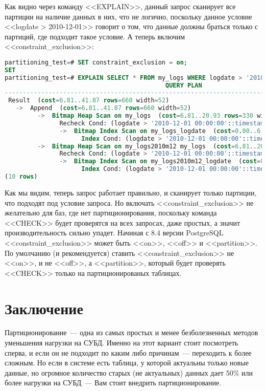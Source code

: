 Как видно через команду <<EXPLAIN>>, данный запрос сканирует все партиции на наличие данных в них, что не логично, 
поскольку данное условие <<logdate > 2010-12-01>> говорит о том, что данные должны браться только с партиций, 
где подходит такое условие. А теперь включим <<constraint\_exclusion>>:
\begin{lstlisting}[language=SQL,label=lst:partitioning15,caption=<<constraint\_exclusion>> ON]
partitioning_test=# SET constraint_exclusion = on;
SET
partitioning_test=# EXPLAIN SELECT * FROM my_logs WHERE logdate > '2010-12-01';
                                            QUERY PLAN                                             
---------------------------------------------------------------------------------------------------
 Result  (cost=6.81..41.87 rows=660 width=52)
   ->  Append  (cost=6.81..41.87 rows=660 width=52)
         ->  Bitmap Heap Scan on my_logs  (cost=6.81..20.93 rows=330 width=52)
               Recheck Cond: (logdate > '2010-12-01 00:00:00'::timestamp without time zone)
               ->  Bitmap Index Scan on my_logs_logdate  (cost=0.00..6.73 rows=330 width=0)
                     Index Cond: (logdate > '2010-12-01 00:00:00'::timestamp without time zone)
         ->  Bitmap Heap Scan on my_logs2010m12 my_logs  (cost=6.81..20.93 rows=330 width=52)
               Recheck Cond: (logdate > '2010-12-01 00:00:00'::timestamp without time zone)
               ->  Bitmap Index Scan on my_logs2010m12_logdate  (cost=0.00..6.73 rows=330 width=0)
                     Index Cond: (logdate > '2010-12-01 00:00:00'::timestamp without time zone)
(10 rows)
\end{lstlisting}

Как мы видим, теперь запрос работает правильно, и сканирует только партиции, что подходят под условие запроса.
Но включать <<constraint\_exclusion>> не желательно для баз, где нет партиционирования, 
поскольку команда <<CHECK>> будет проверятся на всех запросах, даже простых, а значит производительность сильно упадет.
Начиная с 8.4 версии PostgreSQL <<constraint\_exclusion>> может быть <<on>>, <<off>> и <<partition>>. По умолчанию 
(и рекомендуется) ставить 
<<constraint\_exclusion>> не <<on>>, и не <<off>>, а <<partition>>, который будет проверять <<CHECK>> только на 
партиционированых таблицах. 

\section{Заключение}
Партиционирование~--- одна из самых простых и менее безболезненных методов уменьшения нагрузки на СУБД. 
Именно на этот вариант стоит посмотреть сперва, и если он не подходит по каким либо причинам~--- переходить к более сложным.
Но если в системе есть таблица, у которой актуальны только новые данные, но огромное количество старых (не актуальных)
данных дает 50\% или более нагрузки на СУБД~--- Вам стоит внедрить партиционирование.